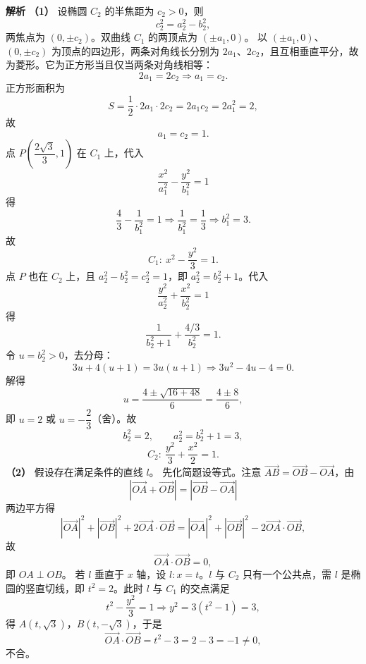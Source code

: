 \begin{answer}
\textbf{解析}
\textbf{（1）} 设椭圆 $C_2$ 的半焦距为 $c_2>0$，则
\nopagebreak[4]
\[c_2^2=a_2^2-b_2^2,\]
两焦点为 $(0,\pm c_2)$。双曲线 $C_1$ 的两顶点为 $(\pm a_1,0)$。
以 $(\pm a_1,0)$、$(0,\pm c_2)$ 为顶点的四边形，两条对角线长分别为 $2a_1$、$2c_2$，且互相垂直平分，故为菱形。它为正方形当且仅当两条对角线相等：
\nopagebreak[4]
\[2a_1=2c_2\Longrightarrow a_1=c_2 .\]
正方形面积为
\nopagebreak[4]
\[S=\frac12\cdot2a_1\cdot2c_2=2a_1c_2=2a_1^2=2,\]
故
\nopagebreak[4]
\[a_1=c_2=1 .\]
点 $P\left(\dfrac{2\sqrt3}3,1\right)$ 在 $C_1$ 上，代入
\nopagebreak[4]
\[\frac{x^2}{a_1^2}-\frac{y^2}{b_1^2}=1\]
得
\nopagebreak[4]
\[\frac43-\frac1{b_1^2}=1\Longrightarrow\frac1{b_1^2}=\frac13\Longrightarrow b_1^2=3 .\]
故
\nopagebreak[4]
\[C_1:\ x^2-\frac{y^2}3=1 .\]
点 $P$ 也在 $C_2$ 上，且 $a_2^2-b_2^2=c_2^2=1$，即 $a_2^2=b_2^2+1$。代入
\nopagebreak[4]
\[\frac{y^2}{a_2^2}+\frac{x^2}{b_2^2}=1\]
得
\nopagebreak[4]
\[\frac1{b_2^2+1}+\frac{4/3}{b_2^2}=1 .\]
令 $u=b_2^2>0$，去分母：
\nopagebreak[4]
\[3u+4(u+1)=3u(u+1)\Longrightarrow3u^2-4u-4=0 .\]
解得
\nopagebreak[4]
\[u=\frac{4\pm\sqrt{16+48}}6=\frac{4\pm8}6,\]
即 $u=2$ 或 $u=-\dfrac23$（舍）。故
\nopagebreak[4]
\[b_2^2=2,\qquad a_2^2=b_2^2+1=3,\]
\nopagebreak[4]
\[C_2:\ \frac{y^2}3+\frac{x^2}2=1 .\]
\textbf{（2）} 假设存在满足条件的直线 $l$。
先化简题设等式。注意 $\overrightarrow{AB}=\overrightarrow{OB}-\overrightarrow{OA}$，由
\nopagebreak[4]
\[|\overrightarrow{OA}+\overrightarrow{OB}|=|\overrightarrow{OB}-\overrightarrow{OA}|\]
两边平方得
\nopagebreak[4]
\[|\overrightarrow{OA}|^2+|\overrightarrow{OB}|^2+2\overrightarrow{OA}\cdot\overrightarrow{OB}
=|\overrightarrow{OA}|^2+|\overrightarrow{OB}|^2-2\overrightarrow{OA}\cdot\overrightarrow{OB},\]
故
\nopagebreak[4]
\[\overrightarrow{OA}\cdot\overrightarrow{OB}=0,\]
即 $OA\perp OB$。
若 $l$ 垂直于 $x$ 轴，设 $l:x=t$。$l$ 与 $C_2$ 只有一个公共点，需 $l$ 是椭圆的竖直切线，即 $t^2=2$。此时 $l$ 与 $C_1$ 的交点满足
\nopagebreak[4]
\[t^2-\frac{y^2}3=1\Longrightarrow y^2=3(t^2-1)=3,\]
得 $A(t,\sqrt3)$，$B(t,-\sqrt3)$，于是
\nopagebreak[4]
\[\overrightarrow{OA}\cdot\overrightarrow{OB}=t^2-3=2-3=-1\neq0,\]
不合。

\end{answer}
